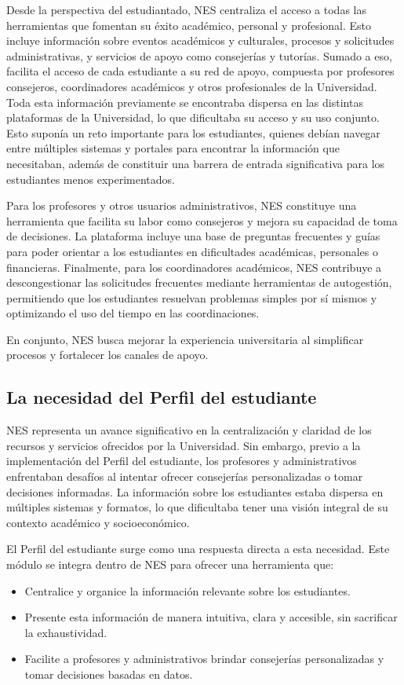 Desde la perspectiva del estudiantado, NES centraliza el acceso a todas las herramientas que fomentan su éxito académico, personal y profesional. Esto incluye información sobre eventos académicos y culturales, procesos y solicitudes administrativas, y servicios de apoyo como consejerías y tutorías. Sumado a eso, facilita el acceso de cada estudiante a su red de apoyo, compuesta por profesores consejeros, coordinadores académicos y otros profesionales de la Universidad. Toda esta información previamente se encontraba dispersa en las distintas plataformas de la Universidad, lo que dificultaba su acceso y su uso conjunto. Esto suponía un reto importante para los estudiantes, quienes debían navegar entre múltiples sistemas y portales para encontrar la información que necesitaban, además de constituir una barrera de entrada significativa para los estudiantes menos experimentados.

Para los profesores y otros usuarios administrativos, NES constituye una herramienta que facilita su labor como consejeros y mejora su capacidad de toma de decisiones. La plataforma incluye una base de preguntas frecuentes y guías para poder orientar a los estudiantes en dificultades académicas, personales o financieras. Finalmente, para los coordinadores académicos, NES contribuye a descongestionar las solicitudes frecuentes mediante herramientas de autogestión, permitiendo que los estudiantes resuelvan problemas simples por sí mismos y optimizando el uso del tiempo en las coordinaciones.

En conjunto, NES busca mejorar la experiencia universitaria al simplificar procesos y fortalecer los canales de apoyo.

\subsection{La necesidad del Perfil del estudiante}

NES representa un avance significativo en la centralización y claridad de los recursos y servicios ofrecidos por la Universidad. Sin embargo, previo a la implementación del Perfil del estudiante, los profesores y administrativos enfrentaban desafíos al intentar ofrecer consejerías personalizadas o tomar decisiones informadas. La información sobre los estudiantes estaba dispersa en múltiples sistemas y formatos, lo que dificultaba tener una visión integral de su contexto académico y socioeconómico.

El Perfil del estudiante surge como una respuesta directa a esta necesidad. Este módulo se integra dentro de NES para ofrecer una herramienta que:
\begin{itemize}
	\item Centralice y organice la información relevante sobre los estudiantes.
	\item Presente esta información de manera intuitiva, clara y accesible, sin sacrificar la exhaustividad.
	\item Facilite a profesores y administrativos brindar consejerías personalizadas y tomar decisiones basadas en datos.
\end{itemize}

